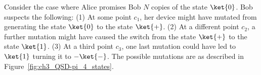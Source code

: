 \begin{appendices}
Consider the case where Alice promises Bob $N$ copies of the state $\ket{0}$.
Bob suspects the following:
(1) At some point $c_1$, her device might have mutated from generating the state $\ket{0}$ to the state $\ket{+}$.
(2) At a different point $c_2$, a further mutation might have caused the switch from the state $\ket{+}$ to the state $\ket{1}$.
(3) At a third point $c_3$, one last mutation could have led to $\ket{1}$ turning it to $-\ket{-}$.
The possible mutations are as described in Figure~\ref{fig:ch3_QSD-pi_4_states}.

\def\xmax{2.0}
\def\ul{0.6}
\def\R{2.0}
\def\ang{45}

\begin{figure}[htbp]
    \centering


\end{figure}
\end{appendices}
